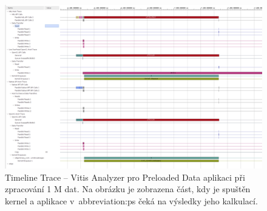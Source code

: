 \documentclass[a4paper, twoside, 11pt]{article}
\newcommand{\fbar}{\FloatBarrier}
\begin{document}
	\begin{figure}[htbp!]
		\centering
		\includegraphics[width=1\textwidth]{src/png/vitis-analyzer/legacy-rt/1M-data/writing-data-output/legacy-rt-step-0.000001-timeline-trace-execution.png}
		\caption{Timeline Trace – Vitis Analyzer pro Preloaded Data aplikaci při zpracování 1 M dat. Na obrázku je zobrazena část, kdy je spuštěn kernel a aplikace v~\gls{abbreviation:ps} čeká na výsledky jeho kalkulací.}
		\label{fig:legacy-rt-step-0.000001-timeline-trace-execution}
	\end{figure}


	\fbar
\end{document}
